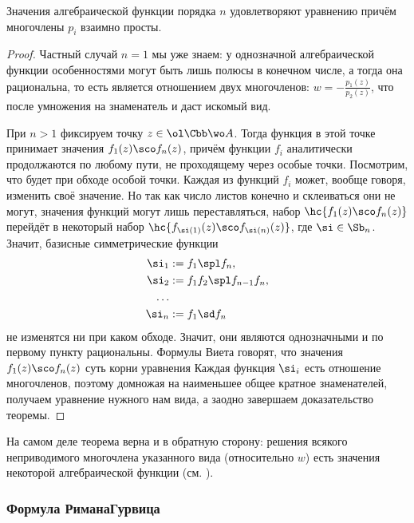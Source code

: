 \documentclass[a4paper]{article}
\begin{document}
\begin{theorem}Значения алгебраической функции порядка $n$ удовлетворяют уравнению
причём многочлены $p_i$ взаимно просты.
\end{theorem}
\begin{proof}
 Частный случай $n=1$ мы уже знаем: у однозначной алгебраической функции особенностями могут быть
лишь полюсы в конечном числе, а тогда она рациональна, то есть является отношением двух многочленов:
$w = -\frac{p_1(z)}{p_2(z)}$, что после умножения на знаменатель и даст искомый вид.

 При $n > 1$ фиксируем точку $z\in \ol\Cbb\wo A$. Тогда функция в этой точке принимает значения $f_1(z)\sco f_n(z)$,
причём функции $f_i$ аналитически продолжаются по любому пути, не проходящему через особые точки. Посмотрим, что будет
при обходе особой точки. Каждая из функций $f_i$ может, вообще говоря, изменить своё значение. Но так как число листов
конечно и склеиваться они не могут, значения функций могут лишь переставляться,  набор $\hc{f_1(z)\sco f_n(z)}$
перейдёт в некоторый набор $\hc{f_{\si(1)}(z)\sco f_{\si(n)}(z)}$, где $\si \in \Sb_n$. Значит, базисные
симметрические функции
\begin{align*}
\si_1 & := f_1 \spl f_n,\\
\si_2 & := f_1f_2 \spl f_{n-1}f_n,\\
\dots\\
\si_n & := f_1\sd f_n
\end{align*}
не изменятся ни при каком обходе. Значит, они являются однозначными и по первому пункту рациональны. Формулы
Виета говорят, что значения $f_1(z)\sco f_n(z)$ суть корни уравнения
Каждая функция $\si_i$ есть отношение многочленов, поэтому домножая на наименьшее общее кратное знаменателей,
получаем уравнение нужного нам вида, а заодно завершаем доказательство теоремы.
\end{proof}

На самом деле теорема верна и в обратную сторону: решения всякого неприводимого многочлена
указанного вида (относительно $w$) есть значения некоторой алгебраической функции (см. \cite[гл. IV, \S 11]{shabat}).

\subsubsection{Формула Римана\ч Гурвица}
\end{document}
